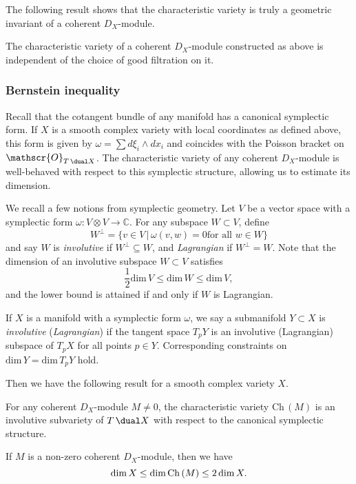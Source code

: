 The following result shows that the characteristic variety is truly a geometric
invariant of a coherent \(D_X\)-module.
\begin{theorem}\label{thm-indep-filtration}
    The characteristic variety of a coherent \(D_X\)-module constructed as above
    is independent of the choice of good filtration on it.
\end{theorem}

\subsubsection{Bernstein inequality} Recall that the
cotangent bundle of any manifold has a canonical symplectic form. If \(X\) is a
smooth complex variety with local coordinates as defined above, this form is
given by \(\omega = \sum d\xi_i\wedge dx_i\) and coincides with the Poisson
bracket on \(\mathscr{O}_{T\,\dual X}\). The characteristic variety of any
coherent \(D_X\)-module is well-behaved with respect to this symplectic
structure, allowing us to estimate its dimension. 

We recall a few notions from symplectic geometry. Let \(V\) be a vector space
with a symplectic form \(\omega:V\otimes V\rightarrow \mathbb{C}\). For any
subspace \(W\subset V\), define \[W^\perp = \{v\in V\,|\, \omega(v,w)=0 \text{
for all }w\in W\}\] and say \(W\) is \textit{involutive} if \(W^\perp \subseteq
W\), and \textit{Lagrangian} if \(W^\perp = W\). Note that the dimension of an
involutive subspace \(W\subset V\) satisfies \[\frac{1}{2}\text{dim}\,V\leq
\text{dim}\,W\leq \text{dim}\, V,\] and the lower bound is attained if and only
if \(W\) is Lagrangian.

If \(X\) is a manifold with a symplectic form \(\omega\), we say a submanifold
\(Y\subset X\) is \textit{involutive} (\textit{Lagrangian}) if the tangent space
\(T_pY\) is an involutive (Lagrangian) subspace of \(T_pX\) for all points
\(p\in Y\). Corresponding constraints on \(\text{dim}\,Y  = \text{dim}\,T_pY\)
hold.

Then we have the following result for a smooth complex variety \(X\).

\begin{theorem}
   For any coherent $D_X$-module \(M\neq 0\), the characteristic variety
   $\text{Ch}\,(M)$ is an involutive subvariety of $T\,\dual X$ with respect to
   the canonical symplectic structure.  
\end{theorem}

\begin{corollary}\label{cor:dimension} 
    If $M$ is a non-zero coherent $D_X$-module, then we have
    \[\textnormal{dim}\,X\leq\textnormal{dim}\,\textnormal{Ch}\,(M)\leq 2\,
    \textnormal{dim}\,X.\] 
\end{corollary}

